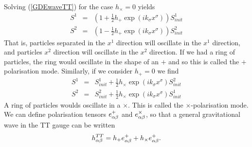 Solving (\ref{GDEwaveTT}) for the case $h_{\times}=0$ yields
\begin{equation}\label{PlusPol}
\begin{array}{lcl}
S^1 &=& (1+\frac{1}{2}h_+\exp(ik_\sigma x^\sigma))S^1_{init} \\
S^2 &=& (1-\frac{1}{2}h_+\exp(ik_\sigma x^\sigma))S^2_{init}
\end{array}
\end{equation}
That is, particles separated in the $x^1$ direction will oscillate in the $x^1$ direction, and particles $x^2$ direction will oscillate in the $x^2$ direction. If we had a ring of particles, the ring would oscillate in the shape of an $+$ and so this is called the $+$ polarisation mode. Similarly, if we consider $h_+=0$ we find
\begin{equation}\label{CrossPol}
\begin{array}{lcl}
S^1 &=& S^1_{init}+\frac{1}{2}h_{\times}\exp(ik_\sigma x^\sigma) S^2_{init} \\
S^2 &=& S^2_{init}+\frac{1}{2}h_{\times}\exp(ik_\sigma x^\sigma) S^1_{init}
\end{array}
\end{equation}
A ring of particles woulds oscillate in a $\times$. This is called the $\times$-polarisation mode. We can define polarisation tensors $e^+_{{\alpha} {\beta}}$ and $e^\times_{{\alpha} {\beta}}$, so that a general gravitational wave in the TT gauge can be written
\begin{equation}
h^{TT}_{{\alpha} {\beta}} = h_+ e^+_{{\alpha} {\beta}}+h_\times e^+_{{\alpha} {\beta}}.
\end{equation}

